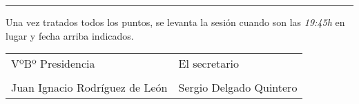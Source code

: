 \documentclass[a4paper,12pt]{article}
\begin{document}

\vspace{1cm}
\hrule
\vspace{3mm}

Una vez tratados todos los puntos, se levanta la sesión cuando son las \textit{19:45h} en lugar y fecha arriba indicados.

\vspace{1cm}

\begin{table}[h]
    \begin{tabular}{p{9cm}p{9cm}}
        VºBº Presidencia & El secretario \\
        \vspace{3cm} & \vspace{3cm} \\
        Juan Ignacio Rodríguez de León & Sergio Delgado Quintero \\
    \end{tabular}
\end{table}
\end{document}
